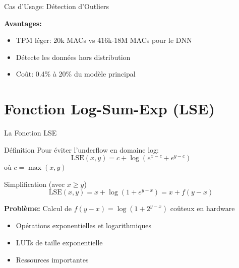 \documentclass[aspectratio=169]{beamer}
\begin{document}
\begin{frame}{Cas d'Usage: Détection d'Outliers}
\begin{center}
\end{center}

\vspace{0.3cm}
\textbf{Avantages:}
\begin{itemize}
\item TPM léger: 20k MACs vs 416k-18M MACs pour le DNN
\item Détecte les données hors distribution
\item Coût: 0.4\% à 20\% du modèle principal
\end{itemize}
\end{frame}

\section{Fonction Log-Sum-Exp (LSE)}

\begin{frame}{La Fonction LSE}
\begin{block}{Définition}
Pour éviter l'underflow en domaine log:
\[
\text{LSE}(x, y) = c + \log\left(e^{x-c} + e^{y-c}\right)
\]
où $c = \max(x, y)$
\end{block}

\begin{block}{Simplification (avec $x \geq y$)}
\[
\text{LSE}(x, y) = x + \log\left(1 + e^{y-x}\right) = x + f(y-x)
\]
\end{block}

\vspace{0.3cm}
\textbf{Problème:} Calcul de $f(y-x) = \log(1 + 2^{y-x})$ coûteux en hardware
\begin{itemize}
\item Opérations exponentielles et logarithmiques
\item LUTs de taille exponentielle
\item Ressources importantes
\end{itemize}
\end{frame}
\end{document}
